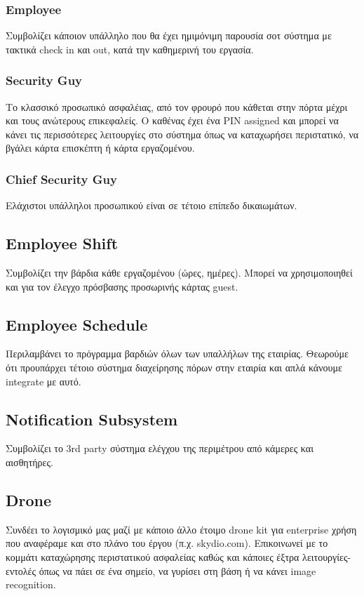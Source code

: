 \documentclass{article}
\begin{document}
\subsubsection{Employee}
Συμβολίζει κάποιον υπάλληλο που θα έχει ημιμόνιμη παρουσία σοτ σύστημα με τακτικά check in και out, κατά την καθημερινή του εργασία.

\subsubsection{Security Guy}
Το κλασσικό προσωπικό ασφαλέιας, από τον φρουρό που κάθεται στην πόρτα μέχρι και τους ανώτερους επικεφαλείς. Ο καθένας έχει ένα PIN assigned και μπορεί να κάνει τις περισσότερες λειτουργίες στο σύστημα όπως να καταχωρήσει περιστατικό, να βγάλει κάρτα επισκέπτη ή κάρτα εργαζομένου.

\subsubsection{Chief Security Guy}
Ελάχιστοι υπάλληλοι προσωπικού είναι σε τέτοιο επίπεδο δικαιωμάτων. 

\subsection{Employee Shift}
Συμβολίζει την βάρδια κάθε εργαζομένου (ώρες, ημέρες). Μπορεί να χρησιμοποιηθεί και για τον έλεγχο πρόσβασης προσωρινής κάρτας guest.

\subsection{Employee Schedule}
Περιλαμβάνει το πρόγραμμα βαρδιών όλων των υπαλλήλων της εταιρίας. Θεωρούμε ότι προυπάρχει τέτοιο σύστημα διαχείρησης πόρων στην εταιρία και απλά κάνουμε integrate με αυτό.

\subsection{Notification Subsystem}
Συμβολίζει το 3rd party σύστημα ελέγχου της περιμέτρου από κάμερες και αισθητήρες.

\subsection{Drone}
Συνδέει το λογισμικό μας μαζί με κάποιο άλλο έτοιμο drone kit για enterprise χρήση που αναφέραμε και στο πλάνο του έργου (π.χ. skydio.com). Επικοινωνεί με το κομμάτι καταχώρησης περιστατικού ασφαλείας καθώς και κάποιες έξτρα λειτουργίες-εντολές όπως να πάει σε ένα σημείο, να γυρίσει στη βάση ή να κάνει image recognition.
\end{document}

